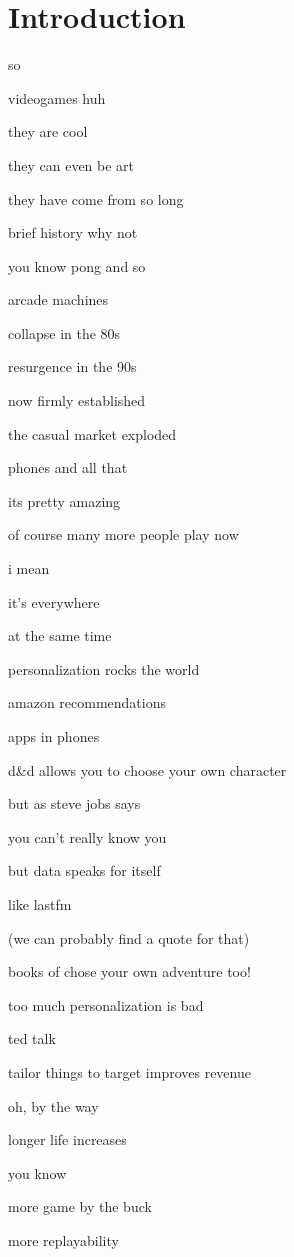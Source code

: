 \chapter{Introduction}

so

videogames huh

they are cool

they can even be art

they have come from so long

brief history why not

you know pong and so

arcade machines

collapse in the 80s

resurgence in the 90s

now firmly established

the casual market exploded

phones and all that

its pretty amazing

of course many more people play now

i mean

it's everywhere

at the same time

personalization rocks the world

amazon recommendations

apps in phones

d&d allows you to choose your own character

but as steve jobs says

you can't really know you

but data speaks for itself

like lastfm

(we can probably find a quote for that)

books of chose your own adventure too!

too much personalization is bad

ted talk

tailor things to target improves revenue

oh, by the way

longer life increases

you know

more game by the buck

more replayability

